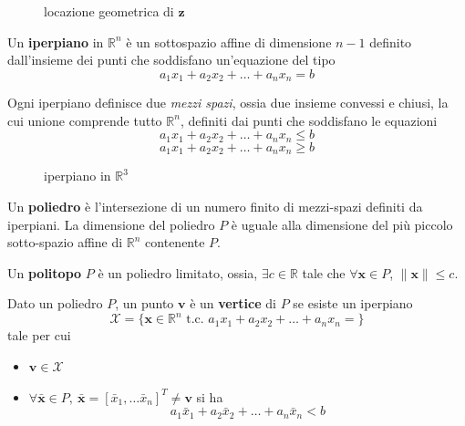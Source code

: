 \documentclass[10pt, letterpaper]{report}
\begin{document}
\begin{figure}[h]\label{fig:segmento}
    \caption{locazione geometrica di $\mathbf z$}
\end{figure}
\begin{definizione}
    Un \textbf{iperpiano} in $\mathbb R^n$ è un sottospazio affine di dimensione $n-1$ definito dall'insieme dei punti che soddisfano un'equazione del tipo 
    $$ a_1 x_1+a_2 x_2+\dots +a_n x_n= b$$
\end{definizione}
Ogni iperpiano definisce due \textit{mezzi spazi}, ossia due insieme convessi e chiusi, la cui unione comprende tutto $\mathbb R^n$, definiti dai punti che soddisfano le equazioni 
$$ a_1 x_1+a_2 x_2+\dots +a_n x_n\le b$$
$$ a_1 x_1+a_2 x_2+\dots +a_n x_n\ge b$$
\begin{figure}[h!]
    \centering
    \caption{iperpiano in $\mathbb R^3$}
\end{figure}
\begin{definizione}
    Un \textbf{poliedro} è l'intersezione di un numero finito di mezzi-spazi definiti da iperpiani. La dimensione del poliedro $P$ è uguale alla dimensione del più piccolo sotto-spazio affine di $\mathbb R^n$ contenente $P$. 
\end{definizione}
\begin{definizione}
    Un \textbf{politopo} $P$ è un poliedro limitato, ossia, $\exists c\in \mathbb R$ tale che  $\forall \mathbf x \in P$,  $\|\mathbf x\|\le c$.
\end{definizione}
\begin{definizione}
    Dato un poliedro $P$, un punto $\mathbf v$ è un \textbf{vertice} di $P$ se esiste un iperpiano $$\mathcal X = \{\mathbf x \in \mathbb R^n\text{ t.c. }a_1 x_1+a_2 x_2+\dots +a_n x_n= \}$$ tale per cui\begin{itemize}\item $\mathbf v\in\mathcal X$\item $\forall \bar{\mathbf x} \in P, \ \bar{\mathbf x}=[\bar x_1,\dots \bar x_n]^T \ne \mathbf v$ si ha 
    $$ a_1 \bar x_1+a_2\bar x_2+\dots +a_n\bar x_n<  b$$\end{itemize}
\end{definizione}
\end{document}
